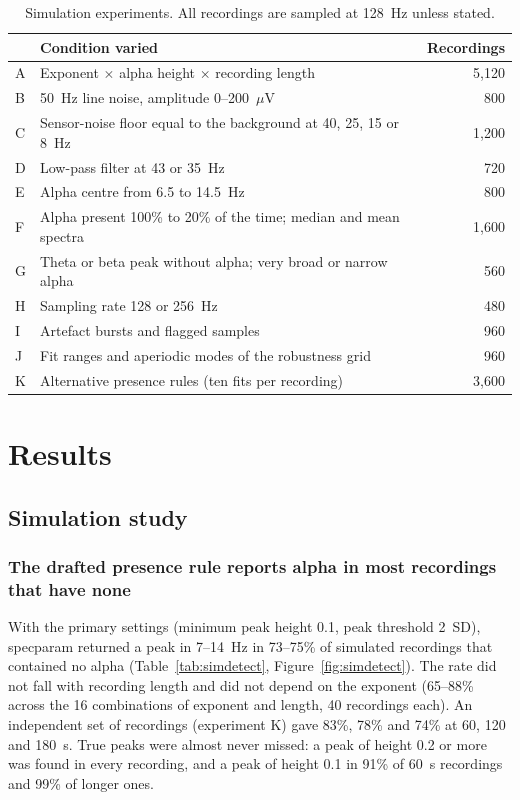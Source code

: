 \documentclass[11pt,a4paper]{article}
\begin{document}
\begin{table}[ht]
\centering
\caption{Simulation experiments. All recordings are sampled at 128~Hz unless stated.}
\label{tab:simdesign}
\begin{tabular}{llr}
\toprule
 & Condition varied & Recordings \\
\midrule
A & Exponent $\times$ alpha height $\times$ recording length & 5,120 \\
B & 50~Hz line noise, amplitude 0--200~$\mu$V & 800 \\
C & Sensor-noise floor equal to the background at 40, 25, 15 or 8~Hz & 1,200 \\
D & Low-pass filter at 43 or 35~Hz & 720 \\
E & Alpha centre from 6.5 to 14.5~Hz & 800 \\
F & Alpha present 100\% to 20\% of the time; median and mean spectra & 1,600 \\
G & Theta or beta peak without alpha; very broad or narrow alpha & 560 \\
H & Sampling rate 128 or 256~Hz & 480 \\
I & Artefact bursts and flagged samples & 960 \\
J & Fit ranges and aperiodic modes of the robustness grid & 960 \\
K & Alternative presence rules (ten fits per recording) & 3,600 \\
\bottomrule
\end{tabular}
\end{table}


\section{Results}

\subsection{Simulation study}
\label{sec:simresults}

\subsubsection{The drafted presence rule reports alpha in most recordings that have none}

With the primary settings (minimum peak height 0.1, peak threshold 2~SD), specparam
returned a peak in 7--14~Hz in 73--75\% of simulated recordings that contained no alpha
(Table~\ref{tab:simdetect}, Figure~\ref{fig:simdetect}). The rate did not fall with
recording length and did not depend on the exponent (65--88\% across the 16 combinations
of exponent and length, 40 recordings each). An independent set of recordings (experiment
K) gave 83\%, 78\% and 74\% at 60, 120 and 180~s. True peaks were almost never missed: a
peak of height 0.2 or more was found in every recording, and a peak of height 0.1 in 91\%
of 60~s recordings and 99\% of longer ones.
\end{document}
